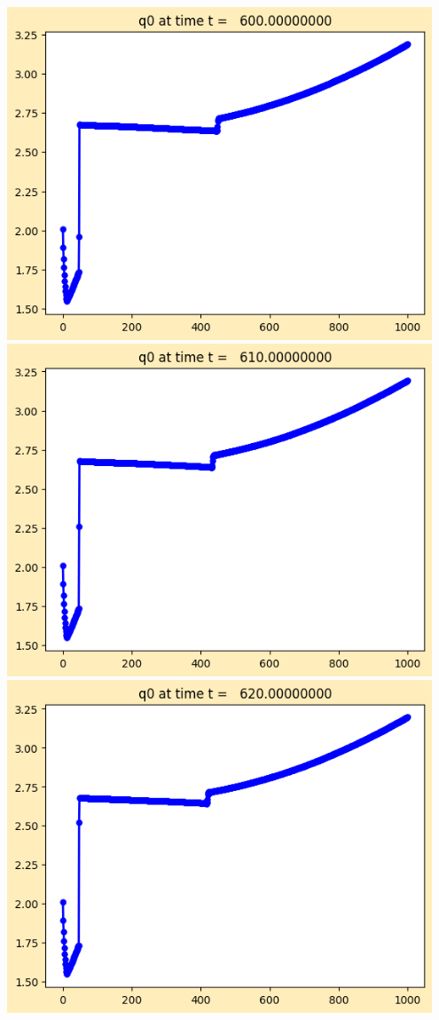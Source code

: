 \documentclass[11pt]{article}
\begin{document}
\vskip 10pt 
\includegraphics[width=0.95\textwidth]{frame0060fig1.png}
\vskip 10pt 
\includegraphics[width=0.95\textwidth]{frame0061fig1.png}
\vskip 10pt 
\includegraphics[width=0.95\textwidth]{frame0062fig1.png}
\end{document}
